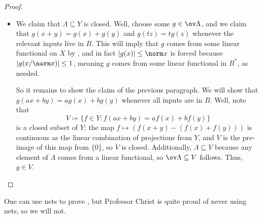 \documentclass[../notes.tex]{subfiles}
\begin{document}
\begin{proof}
\begin{itemize}
		\item We claim that $\Lambda\subseteq Y$ is closed. Well, choose some $g\in\ov\Lambda$, and we claim that $g(x+y)=g(x)+g(y)$ and $g(tz)=tg(z)$ whenever the relevant inputs live in $B$. This will imply that $g$ comes from some linear functional on $X$ by , and in fact $\left|g(x)\right|\le\norm x$ is forced because $\left|g(x/\norm x)\right|\le1$, meaning $g$ comes from some linear functional in $B^*$, as needed.

		So it remains to show the claim of the previous paragraph. We will show that $g(ax+by)=ag(x)+bg(y)$ whenever all inputs are in $B$. Well, note that
		\[V\coloneqq\{f\in Y:f(ax+by)=af(x)+bf(y)\}\]
		is a closed subset of $Y$: the map $f\mapsto(f(x+y)-(f(x)+f(y)))$ is continuous as the linear combination of projections from $Y$, and $V$ is the pre-image of this map from $\{0\}$, so $V$ is closed. Additionally, $\Lambda\subseteq V$ because any element of $\Lambda$ comes from a linear functional, so $\ov\Lambda\subseteq V$ follows. Thus, $g\in V$.
		\qedhere
	\end{itemize}
\end{proof}
\begin{remark}
	One can use nets to prove , but Professor Christ is quite proud of never using nets, so we will not.
\end{remark}
\end{document}
